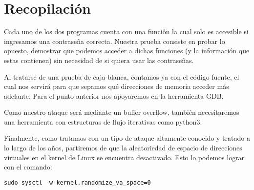 \section{Recopilación}

Cada uno de los dos programas cuenta con una función la cual solo es accesible si ingresamos una contraseña correcta. Nuestra prueba consiste en probar lo opuesto, demostrar que podemos acceder a dichas funciones (y la información que estas contienen) sin necesidad de si quiera usar las contraseñas.

Al tratarse de una prueba de caja blanca, contamos ya con el código fuente, el cual nos servirá para que sepamos qué direcciones de memoria acceder más adelante. Para el punto anterior nos apoyaremos en la herramienta GDB.

Como nuestro ataque será mediante un buffer overflow, también necesitaremos una herramienta con estructuras de flujo iterativas como python3.

Finalmente, como tratamos con un tipo de ataque altamente conocido y tratado a lo largo de los años, partiremos de que la aleatoriedad de espacio de direcciones virtuales en el kernel de Linux se encuentra desactivado. Esto lo podemos lograr con el comando:

\begin{center}
    \texttt{sudo sysctl -w kernel.randomize\_va\_space=0}
\end{center}